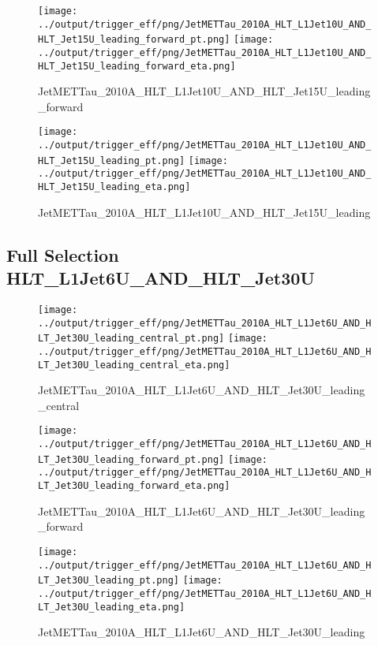 \documentclass[11pt]{article}
\begin{document}
\begin{figure}[ht]
\centering
\texttt{[image: ../output/trigger\_eff/png/JetMETTau\_2010A\_HLT\_L1Jet10U\_AND\_HLT\_Jet15U\_leading\_forward\_pt.png]}
\texttt{[image: ../output/trigger\_eff/png/JetMETTau\_2010A\_HLT\_L1Jet10U\_AND\_HLT\_Jet15U\_leading\_forward\_eta.png]}
\caption{JetMETTau\_2010A\_HLT\_L1Jet10U\_AND\_HLT\_Jet15U\_leading\_forward}
\label{fig:jetmettau_L1Jet10U_AND_HLT_Jet15U_leading_forward}
\end{figure}

\begin{figure}[ht]
\centering
\texttt{[image: ../output/trigger\_eff/png/JetMETTau\_2010A\_HLT\_L1Jet10U\_AND\_HLT\_Jet15U\_leading\_pt.png]}
\texttt{[image: ../output/trigger\_eff/png/JetMETTau\_2010A\_HLT\_L1Jet10U\_AND\_HLT\_Jet15U\_leading\_eta.png]}
\caption{JetMETTau\_2010A\_HLT\_L1Jet10U\_AND\_HLT\_Jet15U\_leading}
\label{fig:jetmettau_L1Jet10U_AND_HLT_Jet15U_leading}
\end{figure}


\newpage
\subsection{Full Selection HLT\_L1Jet6U\_AND\_HLT\_Jet30U}
\begin{figure}[ht]
\centering
\texttt{[image: ../output/trigger\_eff/png/JetMETTau\_2010A\_HLT\_L1Jet6U\_AND\_HLT\_Jet30U\_leading\_central\_pt.png]}
\texttt{[image: ../output/trigger\_eff/png/JetMETTau\_2010A\_HLT\_L1Jet6U\_AND\_HLT\_Jet30U\_leading\_central\_eta.png]}
\caption{JetMETTau\_2010A\_HLT\_L1Jet6U\_AND\_HLT\_Jet30U\_leading\_central}
\label{fig:jetmettau_L1Jet6U_AND_HLT_Jet30U_leading_central}
\end{figure}

\begin{figure}[ht]
\centering
\texttt{[image: ../output/trigger\_eff/png/JetMETTau\_2010A\_HLT\_L1Jet6U\_AND\_HLT\_Jet30U\_leading\_forward\_pt.png]}
\texttt{[image: ../output/trigger\_eff/png/JetMETTau\_2010A\_HLT\_L1Jet6U\_AND\_HLT\_Jet30U\_leading\_forward\_eta.png]}
\caption{JetMETTau\_2010A\_HLT\_L1Jet6U\_AND\_HLT\_Jet30U\_leading\_forward}
\label{fig:jetmettau_L1Jet6U_AND_HLT_Jet30U_leading_forward}
\end{figure}

\begin{figure}[ht]
\centering
\texttt{[image: ../output/trigger\_eff/png/JetMETTau\_2010A\_HLT\_L1Jet6U\_AND\_HLT\_Jet30U\_leading\_pt.png]}
\texttt{[image: ../output/trigger\_eff/png/JetMETTau\_2010A\_HLT\_L1Jet6U\_AND\_HLT\_Jet30U\_leading\_eta.png]}
\caption{JetMETTau\_2010A\_HLT\_L1Jet6U\_AND\_HLT\_Jet30U\_leading}
\label{fig:jetmettau_L1Jet6U_AND_HLT_Jet30U_leading}
\end{figure}
\end{document}
